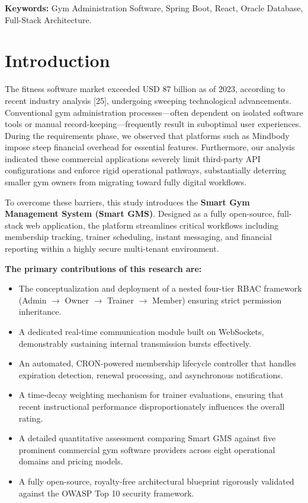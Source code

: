 \noindent\textbf{Keywords:} Gym Administration Software, Spring Boot,
React, Oracle Database, Full-Stack Architecture.

\section{Introduction}\label{introduction}

The fitness software market exceeded USD 87 billion as of 2023,
according to recent industry analysis {[}25{]}, undergoing sweeping
technological advancements. Conventional gym administration
processes---often dependent on isolated software tools or manual
record-keeping---frequently result in suboptimal user experiences.
During the requirements phase, we observed that platforms such as
Mindbody impose steep financial overhead for essential features.
Furthermore, our analysis indicated these commercial applications
severely limit third-party API configurations and enforce rigid
operational pathways, substantially deterring smaller gym owners from
migrating toward fully digital workflows.

To overcome these barriers, this study introduces the \textbf{Smart Gym
Management System (Smart GMS)}. Designed as a fully open-source,
full-stack web application, the platform streamlines critical workflows
including membership tracking, trainer scheduling, instant messaging,
and financial reporting within a highly secure multi-tenant environment.

\textbf{The primary contributions of this research are:}

\begin{itemize}
\tightlist
\item
  The conceptualization and deployment of a nested four-tier RBAC
  framework (Admin \(\rightarrow\) Owner \(\rightarrow\) Trainer
  \(\rightarrow\) Member) ensuring strict permission inheritance.
\item
  A dedicated real-time communication module built on WebSockets,
  demonstrably sustaining internal transmission bursts effectively.
\item
  An automated, CRON-powered membership lifecycle controller that
  handles expiration detection, renewal processing, and asynchronous
  notifications.
\item
  A time-decay weighting mechanism for trainer evaluations, ensuring
  that recent instructional performance disproportionately influences
  the overall rating.
\item
  A detailed quantitative assessment comparing Smart GMS against five
  prominent commercial gym software providers across eight operational
  domains and pricing models.
\item
  A fully open-source, royalty-free architectural blueprint rigorously
  validated against the OWASP Top 10 security framework.
\end{itemize}

